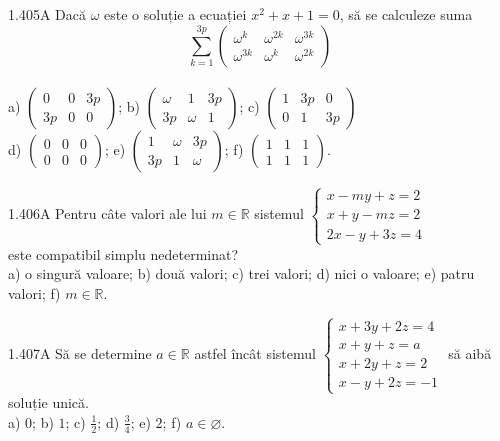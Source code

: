 \documentclass[11pt]{article}
\begin{document}
1.405A Dacă $\omega$ este o soluție a ecuației $x^{2}+x+1=0$, să se calculeze suma $$\sum_{k=1}^{3 p}\left(\begin{array}{ccc}\omega^{k} & \omega^{2 k} & \omega^{3 k} \\\omega^{3 k} & \omega^{k} & \omega^{2 k}\end{array}\right)$$\\ a) $\left(\begin{array}{ccc}0 & 0 & 3 p \\ 3 p & 0 & 0\end{array}\right)$; b) $\left(\begin{array}{ccc}\omega & 1 & 3 p \\ 3 p & \omega & 1\end{array}\right)$; c) $\left(\begin{array}{ccc}1 & 3 p & 0 \\ 0 & 1 & 3 p\end{array}\right)$\\ d) $\left(\begin{array}{lll}0 & 0 & 0 \\ 0 & 0 & 0\end{array}\right)$; e) $\left(\begin{array}{ccc}1 & \omega & 3 p \\ 3 p & 1 & \omega\end{array}\right)$; f) $\left(\begin{array}{lll}1 & 1 & 1 \\ 1 & 1 & 1\end{array}\right)$.

1.406A Pentru câte valori ale lui $m \in \mathbb{R}$ sistemul $\left\{\begin{array}{l}x-m y+z=2 \\ x+y-m z=2 \\ 2 x-y+3 z=4\end{array}\right.$\\este compatibil simplu nedeterminat?\\ a) o singură valoare; b) două valori; c) trei valori; d) nici o valoare; e) patru valori; f) $m \in \mathbb{R}$.

1.407A Să se determine $a \in \mathbb{R}$ astfel încât sistemul $\left\{\begin{array}{l}x+3 y+2 z=4 \\ x+y+z=a \\ x+2 y+z=2 \\ x-y+2 z=-1\end{array}\right.$ să aibă soluție unică.\\ a) $0$; b) $1$; c) $\frac{1}{2}$; d) $\frac{3}{4}$; e) $2$; f) $a \in \varnothing$.
\end{document}
